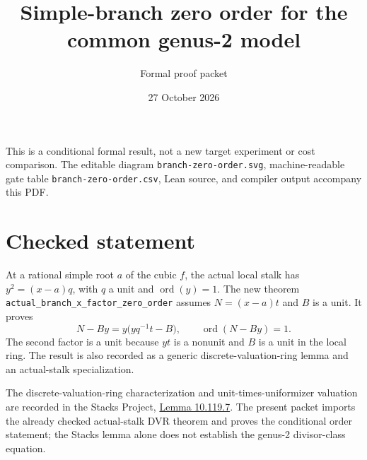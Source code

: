 \documentclass[11pt]{article}
\title{Simple-branch zero order for the common genus-2 model}
\author{Formal proof packet}
\date{27 October 2026}
\begin{document}
\maketitle
\noindent This is a conditional formal result, not a new target experiment or cost comparison. The editable diagram \texttt{branch-zero-order.svg}, machine-readable gate table \texttt{branch-zero-order.csv}, Lean source, and compiler output accompany this PDF.

\section*{Checked statement}
At a rational simple root $a$ of the cubic $f$, the actual local stalk has $y^2=(x-a)q$, with $q$ a unit and $\operatorname{ord}(y)=1$. The new theorem \texttt{actual\_branch\_x\_factor\_zero\_order} assumes $N=(x-a)t$ and $B$ is a unit. It proves
\[
N-By=y\bigl(yq^{-1}t-B\bigr),\qquad \operatorname{ord}(N-By)=1.
\]
The second factor is a unit because $yt$ is a nonunit and $B$ is a unit in the local ring. The result is also recorded as a generic discrete-valuation-ring lemma and an actual-stalk specialization.

The discrete-valuation-ring characterization and unit-times-uniformizer valuation are recorded in the Stacks Project, \href{https://stacks.math.columbia.edu/tag/00PD}{Lemma 10.119.7}. The present packet imports the already checked actual-stalk DVR theorem and proves the conditional order statement; the Stacks lemma alone does not establish the genus-2 divisor-class equation.

\begin{center}
\setlength{\fboxsep}{8pt}
\end{center}
\end{document}
